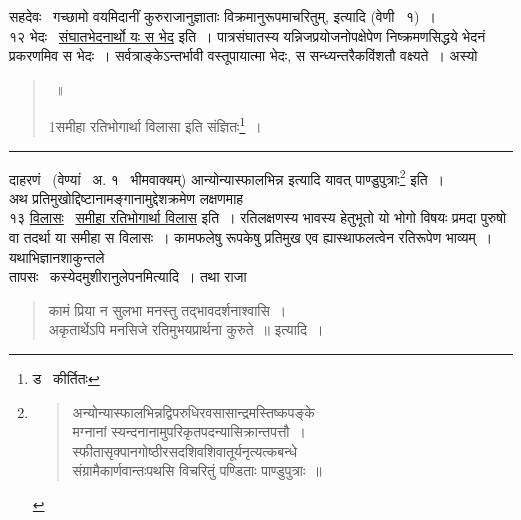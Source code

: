 \documentclass[11pt, openany]{book}
\begin{document}
सहदेवः \textendash\ गच्छामो वयमिदानीं कुरुराजानुज्ञाताः विक्रमानुरूपमाचरितुम्, इत्यादि (वेणी \textendash\ १)~।\\

१२ भेदः \textendash\ \underline{संघातभेदनार्थो यः स भेद} इति~। पात्रसंघातस्य यन्निजप्रयोजनोपक्षेपेण निष्क्रमणसिद्धये भेदनं प्रकरणमिव स भेदः~। सर्वत्राङ्केऽन्तर्भावी वस्तूपायात्मा भेदः, स सन्ध्यन्तरैकविंशतौ वक्ष्यते~। अस्यो \textendash


\newpage
\lfoot{}

\begin{quote}
{\na [ एतानि तु मुखाङ्गानि वक्ष्ये प्रतिमुखे पुनः ]~॥

1समीहा रतिभोगार्था विलासा इति संज्ञितः\renewcommand{\thefootnote}{2}\footnote{ड \textendash\ कीर्तितः}~।}
\end{quote}

\hrule

\vspace{2mm}
\noindent
दाहरणं \textendash\ (वेण्यां \textendash\ अ. १ \textendash\ भीमवाक्यम्) {\qt आन्योन्यास्फालभिन्न} इत्यादि यावत् {\qt पाण्डुपुत्राः}\renewcommand{\thefootnote}{*}\footnote{\begin{quote}
{\qt अन्योन्यास्फालभिन्नद्विपरुधिरवसासान्द्रमस्तिष्कपङ्के\\
मग्नानां स्यन्दनानामुपरिकृतपदन्यासिक्रान्तपत्तौ~।\\
स्फीतासृक्पानगोष्ठीरसदशिवशिवातूर्यनृत्यत्कबन्धे\\
संग्रामैकार्णवान्तःपथसि विचरितुं पण्डिताः पाण्डुपुत्राः~॥}
\end{quote}} इति~।\\

अथ प्रतिमुखोद्दिष्टानामङ्गानामुद्देशक्रमेण लक्षणमाह\\

१३ \underline{विलासः} \textendash\ \underline{समीहा रतिभोगार्था विलास} इति~। रतिलक्षणस्य भावस्य हेतुभूतो यो भोगो विषयः प्रमदा पुरुषो वा तदर्था या समीहा स विलासः~। कामफलेषु रूपकेषु प्रतिमुख एव ह्यास्थाफलत्वेन रतिरूपेण भाव्यम्~। यथाभिज्ञानशाकुन्तले \textendash \\

तापसः \textendash\ कस्येदमुशीरानुलेपनमित्यादि~। तथा राजा \textendash \\

\begin{quote}
{\qt कामं प्रिया न सुलभा मनस्तु तद्भावदर्शनाश्वासि~।\\
अकृतार्थेऽपि मनसिजे रतिमुभयप्रार्थना कुरुते~॥} इत्यादि~।
\end{quote}
\end{document}

